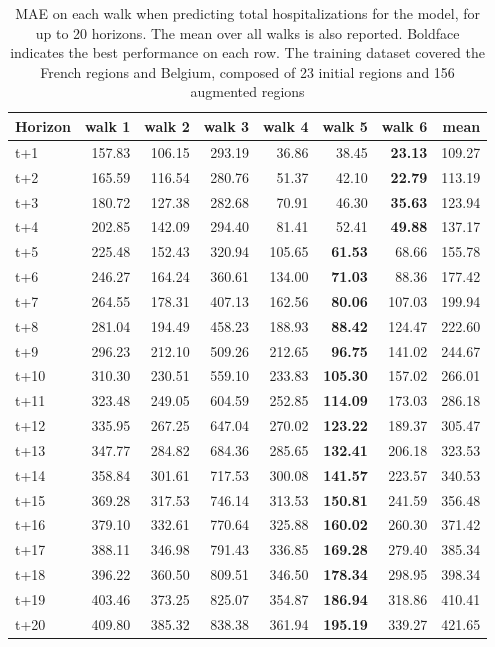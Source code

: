 \begin{table}[H]
\centering
\caption{MAE on each walk when predicting total hospitalizations for the model, for up to 20 horizons. The mean over all walks is also reported. Boldface indicates the best performance on each row. The training dataset covered the French regions and Belgium, composed of 23 initial regions and 156 augmented regions }
\label{tab:MAE_walk_encoder_decoder}
\begin{tabular}{lrrrrrrr}
\toprule
Horizon &  walk 1 &  walk 2 &  walk 3 &  walk 4 &  walk 5 &  walk 6 &   mean \\
\midrule
t+1  & 157.83  & 106.15  & 293.19  & 36.86  & 38.45  & \textbf{23.13}  & 109.27  \\
t+2  & 165.59  & 116.54  & 280.76  & 51.37  & 42.10  & \textbf{22.79}  & 113.19  \\
t+3  & 180.72  & 127.38  & 282.68  & 70.91  & 46.30  & \textbf{35.63}  & 123.94  \\
t+4  & 202.85  & 142.09  & 294.40  & 81.41  & 52.41  & \textbf{49.88}  & 137.17  \\
t+5  & 225.48  & 152.43  & 320.94  & 105.65  & \textbf{61.53}  & 68.66  & 155.78  \\
t+6  & 246.27  & 164.24  & 360.61  & 134.00  & \textbf{71.03}  & 88.36  & 177.42  \\
t+7  & 264.55  & 178.31  & 407.13  & 162.56  & \textbf{80.06}  & 107.03  & 199.94  \\
t+8  & 281.04  & 194.49  & 458.23  & 188.93  & \textbf{88.42}  & 124.47  & 222.60  \\
t+9  & 296.23  & 212.10  & 509.26  & 212.65  & \textbf{96.75}  & 141.02  & 244.67  \\
t+10  & 310.30  & 230.51  & 559.10  & 233.83  & \textbf{105.30}  & 157.02  & 266.01  \\
t+11  & 323.48  & 249.05  & 604.59  & 252.85  & \textbf{114.09}  & 173.03  & 286.18  \\
t+12  & 335.95  & 267.25  & 647.04  & 270.02  & \textbf{123.22}  & 189.37  & 305.47  \\
t+13  & 347.77  & 284.82  & 684.36  & 285.65  & \textbf{132.41}  & 206.18  & 323.53  \\
t+14  & 358.84  & 301.61  & 717.53  & 300.08  & \textbf{141.57}  & 223.57  & 340.53  \\
t+15  & 369.28  & 317.53  & 746.14  & 313.53  & \textbf{150.81}  & 241.59  & 356.48  \\
t+16  & 379.10  & 332.61  & 770.64  & 325.88  & \textbf{160.02}  & 260.30  & 371.42  \\
t+17  & 388.11  & 346.98  & 791.43  & 336.85  & \textbf{169.28}  & 279.40  & 385.34  \\
t+18  & 396.22  & 360.50  & 809.51  & 346.50  & \textbf{178.34}  & 298.95  & 398.34  \\
t+19  & 403.46  & 373.25  & 825.07  & 354.87  & \textbf{186.94}  & 318.86  & 410.41  \\
t+20  & 409.80  & 385.32  & 838.38  & 361.94  & \textbf{195.19}  & 339.27  & 421.65  \\

\bottomrule
\end{tabular}
\end{table}
